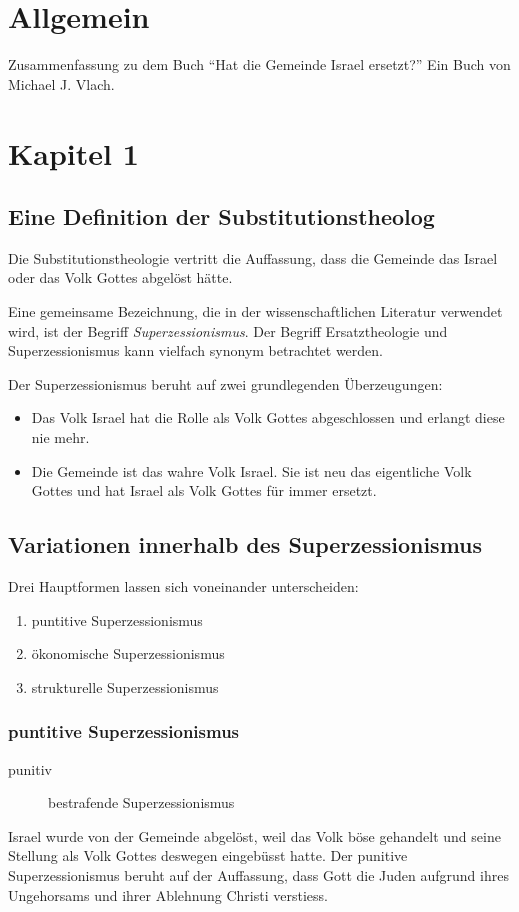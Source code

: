 \documentclass{../../inc/mybib}
\newcommand{\st}{Substitutionstheolog}
\newcommand{\sz}{Superzessionismus}
\begin{document}
    \tableofcontents
    \newpage
    \section{Allgemein}
    Zusammenfassung zu dem Buch \enquote{Hat die Gemeinde Israel ersetzt?} Ein Buch von Michael J. Vlach.
    \section{Kapitel 1}
    \subsection{Eine Definition der \st{}}
    Die Substitutionstheologie vertritt die Auffassung, dass die Gemeinde das Israel oder das Volk Gottes abgelöst hätte.

    Eine gemeinsame Bezeichnung, die in der wissenschaftlichen Literatur verwendet wird, ist der Begriff \textit{\sz}. Der Begriff Ersatztheologie und \sz{} kann vielfach synonym betrachtet werden.

    Der \sz{} beruht auf zwei grundlegenden Überzeugungen:
    \begin{itemize}
        \item Das Volk Israel hat die Rolle als Volk Gottes abgeschlossen und erlangt diese nie mehr.
        \item Die Gemeinde ist das wahre Volk Israel. Sie ist neu das eigentliche Volk Gottes und hat Israel als Volk Gottes für immer ersetzt.
    \end{itemize}
    \subsection{Variationen innerhalb des \sz{}}
    Drei Hauptformen lassen sich voneinander unterscheiden:
    \begin{enumerate}
        \item puntitive \sz
        \item ökonomische \sz
        \item strukturelle \sz
    \end{enumerate}
    \subsubsection{puntitive \sz}
    \begin{description}
        \item[punitiv] bestrafende \sz 
    \end{description}
    Israel wurde von der Gemeinde abgelöst, weil das Volk böse gehandelt und seine Stellung als Volk Gottes deswegen eingebüsst hatte.
    Der punitive \sz{} beruht auf der Auffassung, dass Gott die Juden aufgrund ihres Ungehorsams und ihrer Ablehnung Christi verstiess.\\
    
\end{document}
